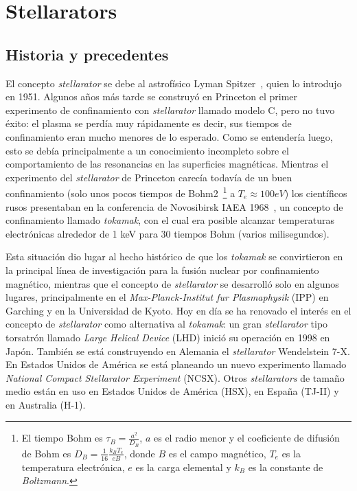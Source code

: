 \chapter{Stellarators}
\section{Historia y precedentes}
El concepto \textit{stellarator} se debe al astrofísico Lyman Spitzer~\cite{doi:10.1063/1.1705883}, quien lo
introdujo en 1951. Algunos años más tarde se construyó en Princeton el primer experimento de confinamiento con \textit{stellarator} llamado modelo C, pero
no tuvo éxito: el plasma se perdía muy rápidamente es decir, sus tiempos
de confinamiento eran mucho menores de lo esperado. Como se entendería
luego, esto se debía principalmente a un conocimiento incompleto sobre el
comportamiento de las resonancias en las superficies magnéticas. Mientras
el experimento del \textit{stellarator} de Princeton carecía todavía de un buen confinamiento (solo unos pocos tiempos de Bohm2~\footnote{El tiempo Bohm es $\tau_B=\frac{a^2}{D_B}$, $a$ es el radio menor y el coeficiente de difusión de Bohm es $D_B=\frac{1}{16}\frac{k_BT_e}{eB}$, donde $B$ es el campo magnético, $T_e$ es la temperatura electrónica, $e$ es la carga elemental y $k_B$ es la constante de \textit{Boltzmann}.}
a $T_e\approx100 eV$) los científicos
rusos presentaban en la conferencia de Novosibirsk IAEA 1968~\cite{Artsimovich1969}, un concepto de confinamiento llamado \textit{tokamak}, con el cual era posible alcanzar
temperaturas electrónicas alrededor de 1 keV para 30 tiempos Bohm (varios
milisegundos).\par
Esta situación dio lugar al hecho histórico de que los \textit{tokamak} se convirtieron en la principal línea de investigación para la fusión nuclear por
confinamiento magnético, mientras que el concepto de \textit{stellarator} se desarrolló solo en algunos lugares, principalmente en el \textit{Max-Planck-Institut fur
Plasmaphysik} (IPP) en Garching y en la Universidad de Kyoto. Hoy en día
se ha renovado el interés en el concepto de \textit{stellarator} como alternativa al
\textit{tokamak}: un gran \textit{stellarator} tipo torsatrón llamado \textit{Large Helical Device}
(LHD) inició su operación en 1998 en Japón. También se está construyendo
en Alemania el \textit{stellarator} Wendelstein 7-X. En Estados Unidos de América
se está planeando un nuevo experimento llamado \textit{National Compact Stellarator Experiment} (NCSX). Otros \textit{stellarators} de tamaño medio están en uso en
Estados Unidos de América (HSX), en España (TJ-II) y en Australia (H-1).\par
